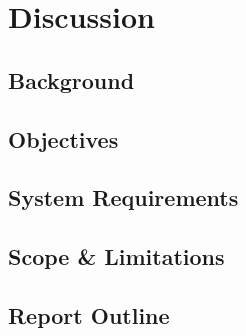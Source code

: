 \documentclass[class=report,11pt,crop=false]{standalone}
\begin{document}
	\chapter{Discussion}
	
	
	
	\section{Background}
	\lipsum[1]
	
	\section{Objectives}
	\lipsum[1]
	
	\section{System Requirements}
	\lipsum[1]
	
	\section{Scope \& Limitations}
	\lipsum[1]
	
	\section{Report Outline}
	\lipsum[1]
	
	\ifstandalone
	
	\printnoidxglossary[type=\acronymtype,nonumberlist]
	\fi
\end{document}
